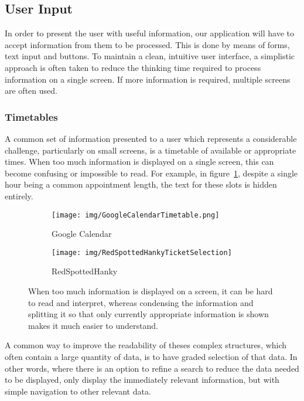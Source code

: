 \subsection{User Input}
\label{sub:user_input}

In order to present the user with useful information, our application will have
to accept information from them to be processed. This is done by means of
forms, text input and buttons. To maintain a clean, intuitive user interface, a
simplistic approach is often taken to reduce the thinking time required to
process information on a single screen. If more information is required,
multiple screens are often used.

\subsubsection{Timetables}
\label{ssub:timetables}

A common set of information presented to a user which represents a considerable
challenge, particularly on small screens, is a timetable of available or
appropriate times.  When too much information is displayed on a single screen,
this can become confusing or impossible to read. For example, in
figure~\ref{fig:GoogleCalendarTimetable}\cite{GoogleCalendar}, despite a single
hour being a common appointment length, the text for these slots is hidden
entirely.

\begin{figure}[ht]
    \centering
    \begin{subfigure}[b]{0.25\textwidth}
        \texttt{[image: img/GoogleCalendarTimetable.png]}
        \caption{Google Calendar}\label{fig:GoogleCalendarTimetable}
    \end{subfigure}%
    \qquad
    \begin{subfigure}[b]{0.25\textwidth}
        \texttt{[image: img/RedSpottedHankyTicketSelection]}
        \caption{RedSpottedHanky}\label{fig:RedSpottedHankyTicketSelection}
    \end{subfigure}
    \caption{When too much information is displayed on a screen, it can be
    hard to read and interpret, whereas condensing the information and
    splitting it so that only currently appropriate information is shown
    makes it much easier to understand.}\label{fig:timetables}
\end{figure}

A common way to improve the readability of theses complex structures, which
often contain a large quantity of data, is to have graded selection of that
data. In other words, where there is an option to refine a search to reduce the
data needed to be displayed, only display the immediately relevant information,
but with simple navigation to other relevant data.

